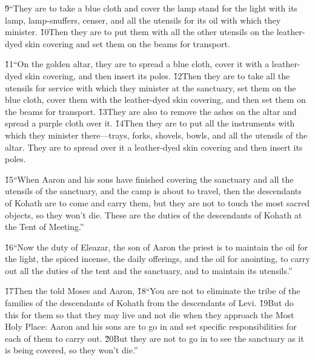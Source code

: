 \v{9}``They are to take a blue cloth and cover the lamp stand for the light with its lamp, lamp-snuffers, censer, and all the utensils for its oil with which they minister. \v{10}Then they are to put them with all the other utensils on the leather-dyed skin covering and set them on the beams for transport.

\v{11}``On the golden altar, they are to spread a blue cloth, cover it with a leather-dyed skin covering, and then insert its poles. \v{12}Then they are to take all the utensils for service with which they minister at the sanctuary, set them on the blue cloth, cover them with the leather-dyed skin covering, and then set them on the beams for transport. \v{13}They are also to remove the ashes on the altar and spread a purple cloth over it. \v{14}Then they are to put all the instruments with which they minister there---trays, forks, shovels, bowls, and all the utensils of the altar. They are to spread over it a leather-dyed skin covering and then insert its poles.

\v{15}``When Aaron and his sons have finished covering the sanctuary and all the utensils of the sanctuary, and the camp is about to travel, then the descendants of Kohath are to come and carry them, but they are not to touch the most sacred objects, so they won't die. These are the duties of the descendants of Kohath at the Tent of Meeting.''

\v{16}``Now the duty of Eleazar, the son of Aaron the priest is to maintain the oil for the light, the spiced incense, the daily offerings, and the oil for anointing, to carry out all the duties of the tent and the sanctuary, and to maintain its utensils.''

\v{17}Then the  told Moses and Aaron, \v{18}``You are not to eliminate the tribe of the families of the descendants of Kohath from the descendants of Levi. \v{19}But do this for them so that they may live and not die when they approach the Most Holy Place: Aaron and his sons are to go in and set specific responsibilities for each of them to carry out. \v{20}But they are not to go in to see the sanctuary as it is being covered, so they won't die.''

